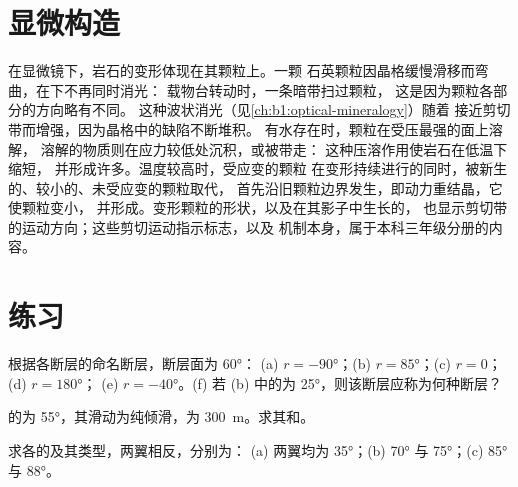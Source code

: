 \section{显微构造}\label{sec:b1:faults-folds-fabrics:micro}

在显微镜下，岩石的变形体现在其颗粒上。一颗
石英颗粒因晶格缓慢滑移而弯曲，在下不再同时消光：
载物台转动时，一条暗带扫过颗粒，
这是因为颗粒各部分的方向略有不同。
这种波状消光（见\cref{ch:b1:optical-mineralogy}）随着
接近剪切带而增强，因为晶格中的缺陷不断堆积。
有水存在时，颗粒在受压最强的面上溶解，
溶解的物质则在应力较低处沉积，或被带走：
这种压溶作用使岩石在低温下缩短，
并形成许多。温度较高时，受应变的颗粒
在变形持续进行的同时，被新生的、较小的、未受应变的颗粒取代，
首先沿旧颗粒边界发生，即动力重结晶，它使颗粒变小，
并形成。变形颗粒的形状，以及在其影子中生长的，
也显示剪切带的运动方向；这些剪切运动指示标志，以及
机制本身，属于本科三年级分册的内容。

\section{练习}

\begin{exercise}[$\star$]\label{exo:b1:faults-folds-fabrics:1}
根据各断层的命名断层，断层面为 \ang{60}：
(a) $r = \ang{-90}$；(b) $r = \ang{85}$；(c) $r = 0$；(d) $r = \ang{180}$；
(e) $r = \ang{-40}$。(f) 若 (b) 中的为 \ang{25}，则该断层应称为何种断层？
\end{exercise}

\begin{exercise}[$\star$]\label{exo:b1:faults-folds-fabrics:2}
的为 \ang{55}，其滑动为纯倾滑，为
\qty{300}{m}。求其和。
\end{exercise}

\begin{exercise}[$\star$]\label{exo:b1:faults-folds-fabrics:3}
求各的及其类型，两翼相反，分别为：
(a) 两翼均为 \ang{35}；(b) \ang{70}
与 \ang{75}；(c) \ang{85} 与 \ang{88}。
\end{exercise}

